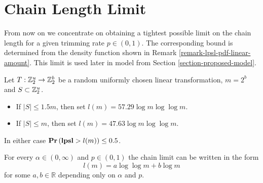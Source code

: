 \section{Chain Length Limit}
\label{section-linear-systems-linear-amount-constant-estimate}
From now on we concentrate on obtaining a tightest possible limit on the chain length for a given trimming rate $p \in (0, 1)$. The corresponding bound is determined from the density function shown in Remark \ref{remark-lpsl-pdf-linear-amount}. This limit is used later in model from Section \ref{section-proposed-model}.

\begin{theorem}
\label{theorem-model-chain-limit-rule}
Let $T: \mathbb{Z}_{2}^{u} \rightarrow \mathbb{Z}_{2}^{b}$ be a random uniformly chosen linear transformation, $m = 2 ^ b$ and $S \subset \mathbb{Z}_{2}^{u}$.
\begin{itemize}
\item If $|S| \leq 1.5 m$, then set $l(m) = 57.29 \log m \log \log m$.
\item If $|S| \leq m$, then set $l(m) = 47.63 \log m \log \log m$.
\end{itemize}
In either case $\mathbf{Pr}\left(\mathbf{lpsl} > l(m)\right) \leq 0.5$.

For every $\alpha \in (0, \infty)$ and $p \in (0, 1)$ the chain limit can be written in the form \[ l(m) = a \log \log m + b \log m \] for some $a, b \in \mathbb{R}$ depending only on $\alpha$ and $p$.
\end{theorem}
